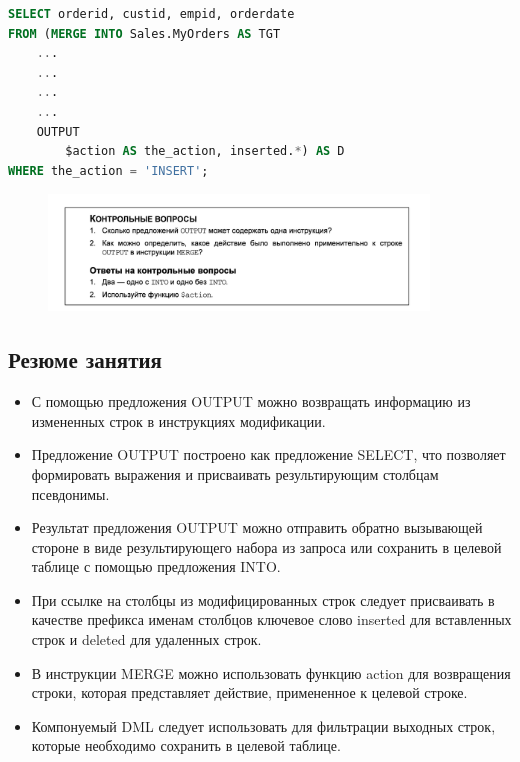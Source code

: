 \begin{lstlisting}[label=lst:funcReturn, language=sql]
SELECT orderid, custid, empid, orderdate
FROM (MERGE INTO Sales.MyOrders AS TGT 
	...
	...
	...
	...
	OUTPUT
 		$action AS the_action, inserted.*) AS D
WHERE the_action = 'INSERT';
\end{lstlisting}

\begin{figure}[h!]
	\begin{center}
		\includegraphics[width=0.9\textwidth]{img/control27.png}
	\end{center}
	\captionsetup{justification=centering}
\end{figure}


\subsection*{Резюме занятия}
\begin{itemize}
	\item С помощью предложения OUTPUT можно возвращать информацию из измененных
	строк в инструкциях модификации. 
	\item Предложение OUTPUT построено как предложение SELECT, что позволяет формировать выражения и присваивать результирующим столбцам псевдонимы. 
	\item Результат предложения OUTPUT можно отправить обратно вызывающей стороне
	в виде результирующего набора из запроса или сохранить в целевой таблице
	с помощью предложения INTO. 
	\item При ссылке на столбцы из модифицированных строк следует присваивать в качестве префикса именам столбцов ключевое слово inserted для вставленных
	строк и deleted для удаленных строк. 
	\item В инструкции MERGE можно использовать функцию action для возвращения
	строки, которая представляет действие, примененное к целевой строке. 
	\item Компонуемый DML следует использовать для фильтрации выходных строк, которые необходимо сохранить в целевой таблице. 
\end{itemize}


